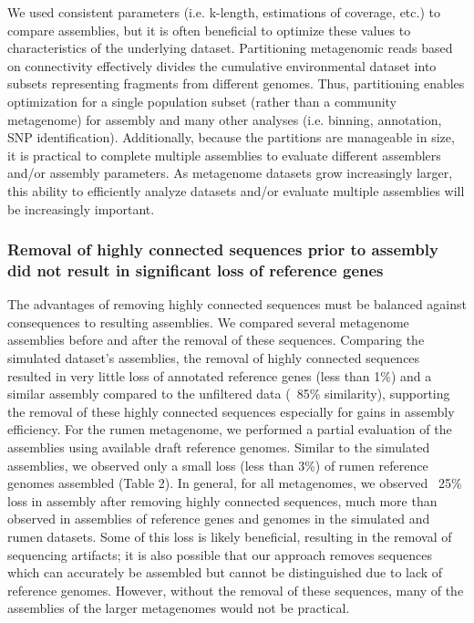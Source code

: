 \documentclass[10pt]{article}
\begin{document}
We used consistent parameters (i.e. k-length, estimations of coverage, etc.) to compare assemblies, but it is often beneficial to optimize these values to characteristics of the underlying dataset.  Partitioning metagenomic reads based on connectivity effectively divides the cumulative environmental dataset into subsets representing fragments from different genomes.  Thus, partitioning enables optimization for a single population subset (rather than a community metagenome) for assembly and many other analyses (i.e. binning, annotation, SNP identification).  Additionally, because the partitions are manageable in size, it is practical to complete multiple assemblies to evaluate different assemblers and/or assembly parameters.  As metagenome datasets grow increasingly larger, this ability to efficiently analyze datasets and/or evaluate multiple assemblies will be increasingly important.

\subsubsection*{Removal of highly connected sequences prior to assembly did not result in significant loss of reference genes}
The advantages of removing highly connected sequences must be balanced against consequences to resulting assemblies.  We compared several metagenome assemblies before and after the removal of these sequences.   Comparing the simulated dataset's assemblies, the removal of highly connected sequences resulted in very little loss of annotated reference genes (less than 1\%) and a similar assembly compared to the unfiltered data (~85\% similarity), supporting the removal of these highly connected sequences especially for gains in assembly efficiency.  For the rumen metagenome, we performed a partial evaluation of the assemblies using available draft reference genomes.   Similar to the simulated assemblies, we observed only a small loss (less than 3\%) of rumen reference genomes assembled (Table 2).  In general, for all metagenomes, we observed ~25\% loss in assembly after removing highly connected sequences, much more than observed in assemblies of reference genes and genomes in the simulated and rumen datasets.  Some of this loss is likely beneficial, resulting in the removal of sequencing artifacts; it is also possible that our approach removes sequences which can accurately be assembled but cannot be distinguished due to lack of reference genomes.  However, without the removal of these sequences, many of the assemblies of the larger metagenomes would not be practical. 
\end{document}
